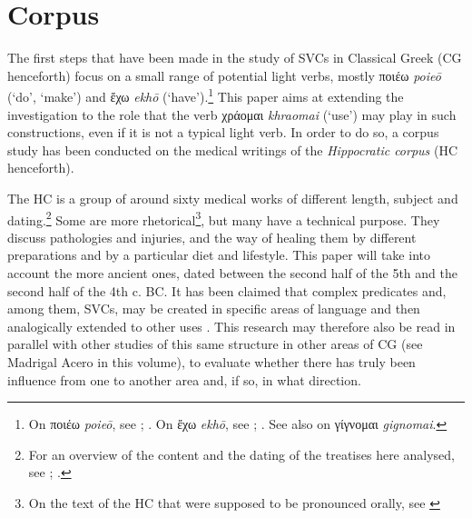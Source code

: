 \documentclass[output=paper,colorlinks,citecolor=brown]{langscibook}
\begin{document}
\section {Corpus}
\largerpage
The first steps that have been made in the study of SVCs in Classical Greek (CG henceforth) focus on a small range of potential light verbs, mostly ποιέω \textit{poieō} (‘do’, ‘make’) and ἔχω \textit{ekhō} (‘have’).\footnote{On ποιέω \textit{poieō}, see \citet{Marini2010}; \citet{JiménezLópez2011,JiménezLópez2012,JiménezLópez2016}. On ἔχω \textit{ekhō}, see \citet{Vanséveren1995}; \citet{tronci2017lexicon}. See also \citet{jimenezlopez2021} on γίγνομαι \textit{gignomai}.} This paper aims at extending the investigation to the role that the verb χράομαι \textit{khraomai} (‘use’) may play in such constructions, even if it is not a typical light verb. In order to do so, a corpus study has been conducted on the medical writings of the \textit{Hippocratic corpus} (HC henceforth). 

The HC is a group of around sixty medical works of different length, subject and dating.\footnote{For an overview of the content and the dating of the treatises here analysed, see \citet{Craik2015}; \citet[529--590]{Jouanna2017}.} Some are more rhetorical\footnote{On the text of the HC that were supposed to be pronounced orally, see \citet{Jouanna1984}}, but many have a technical purpose. They discuss pathologies and injuries, and the way of healing them by different preparations and by a particular diet and lifestyle. This paper will take into account the more ancient ones, dated between the second half of the 5th and the second half of the 4th c. BC.
It has been claimed that complex predicates and, among them, SVCs, may be created in specific areas of language and then analogically extended to other uses \citep{Bowern2008}. This research may therefore also be read in parallel with other studies of this same structure in other areas of CG (see Madrigal Acero in this volume), to evaluate whether there has truly been influence from one to another area and, if so, in what direction.
\end{document}
